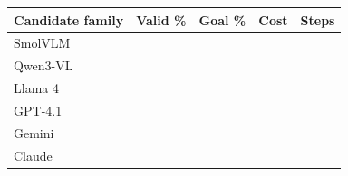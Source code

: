 \begin{tabularx}{\linewidth}{Xrrrr}
\toprule
Candidate family & Valid \% & Goal \% & Cost & Steps\\\midrule
SmolVLM &  &  &  & \\
Qwen3-VL &  &  &  & \\
Llama 4 &  &  &  & \\
GPT-4.1 &  &  &  & \\
Gemini &  &  &  & \\
Claude &  &  &  & \\
\bottomrule
\end{tabularx}
